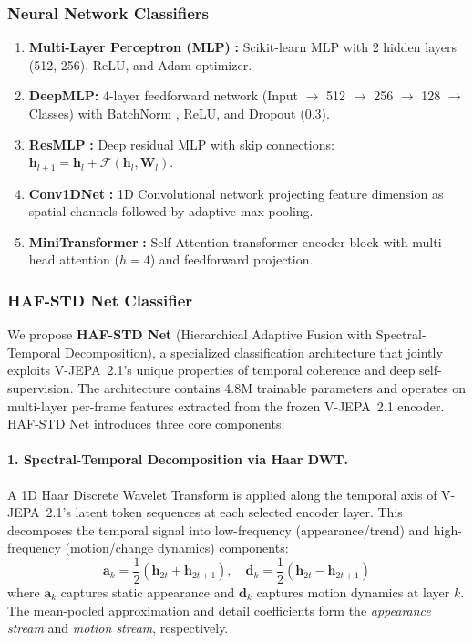 \subsubsection{Neural Network Classifiers}

\begin{enumerate}[leftmargin=*]
    \item \textbf{Multi-Layer Perceptron (MLP)} \citep{rumelhart1986backprop}\textbf{:} Scikit-learn MLP with 2 hidden layers (512, 256), ReLU, and Adam optimizer.
    \item \textbf{DeepMLP:} 4-layer feedforward network (Input $\rightarrow$ 512 $\rightarrow$ 256 $\rightarrow$ 128 $\rightarrow$ Classes) with BatchNorm \citep{ioffe2015batchnorm}, ReLU, and Dropout \citep{srivastava2014dropout} (0.3).
    \item \textbf{ResMLP} \citep{he2016resnet}\textbf{:} Deep residual MLP with skip connections: $\mathbf{h}_{l+1} = \mathbf{h}_l + \mathcal{F}(\mathbf{h}_l, \mathbf{W}_l)$.
    \item \textbf{Conv1DNet} \citep{lecun1998cnn}\textbf{:} 1D Convolutional network projecting feature dimension as spatial channels followed by adaptive max pooling.
    \item \textbf{MiniTransformer} \citep{vaswani2017attention}\textbf{:} Self-Attention transformer encoder block with multi-head attention ($h=4$) and feedforward projection.
\end{enumerate}

\subsubsection{HAF-STD Net Classifier}
\label{sec:hafstd_net}

We propose \textbf{HAF-STD Net} (Hierarchical Adaptive Fusion with Spectral-Temporal Decomposition), a specialized classification architecture that jointly exploits V-JEPA~2.1's unique properties of temporal coherence and deep self-supervision. The architecture contains 4.8M trainable parameters and operates on multi-layer per-frame features extracted from the frozen V-JEPA~2.1 encoder. HAF-STD Net introduces three core components:

\paragraph{1. Spectral-Temporal Decomposition via Haar DWT.}
A 1D Haar Discrete Wavelet Transform is applied along the temporal axis of V-JEPA~2.1's latent token sequences at each selected encoder layer. This decomposes the temporal signal into low-frequency (appearance/trend) and high-frequency (motion/change dynamics) components:
\begin{equation}
\mathbf{a}_k = \frac{1}{2}(\mathbf{h}_{2t} + \mathbf{h}_{2t+1}), \quad
\mathbf{d}_k = \frac{1}{2}(\mathbf{h}_{2t} - \mathbf{h}_{2t+1})
\end{equation}
where $\mathbf{a}_k$ captures static appearance and $\mathbf{d}_k$ captures motion dynamics at layer $k$. The mean-pooled approximation and detail coefficients form the \emph{appearance stream} and \emph{motion stream}, respectively.

